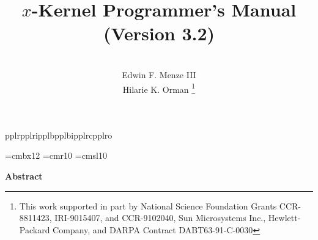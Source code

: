 
\setcounter{tocdepth}{5}




\makeatletter
{}%
{pplr}{pplri}{pplb}{pplbi}{pplrc}{pplro}
\makeatother
\def\caps{\family{palatino}\size{12}{12pt}\selectfont}

\makeatother
\def\nintt{\family{helvetica}\size{9}{11pt}\selectfont}
\makeatother
\def\sanss{\family{helvetica}\size{11}{11pt}\selectfont}
\makeatother
\def\smalltt{\family{courier}\size{9}{11pt}\selectfont}

\newcommand{\COURIERtt}{\fontfamily{courier}\size{9}{11pt}\selectfont}
\newcommand{\CMRtt}{\fontfamily{cmtt}\selectfont}

\font\bold=cmbx12
\font\smallfont=cmr10
\font\sem=cmsl10

\def\xk{$x$-kernel}

\title{$x$-Kernel Programmer's Manual \\ {\rm (Version 3.2)}}
\author{\\ Edwin F. Menze III\\ Hilarie K. Orman \thanks
{This work supported in part by 
National Science Foundation Grants CCR-8811423, IRI-9015407, and CCR-9102040, 
Sun Microsystems Inc., 
Hewlett-Packard Company, 
and DARPA Contract DABT63-91-C-0030}}
\maketitle{}

\begin{center}
{\bf\Large Abstract}
\end{center}
\begin{quote}

\end{quote}

%


\renewcommand\baselinestretch{1}
\small\normalsize

\newpage{}
\makeatletter
\def\@dottedtocline#1#2#3#4#5{\ifnum #1>\c@tocdepth \else
  \vskip \z@ plus.2\p@
  {\leftskip #2\relax \rightskip \@tocrmarg \parfillskip -\rightskip
    \parindent #2\relax\@afterindenttrue
   \interlinepenalty\@M
   \leavevmode
   \@tempdima #3\relax \advance\leftskip \@tempdima \hbox{}\hskip -\leftskip
    #4\nobreak\leaders\hbox{$\m@th \mkern \@dotsep mu\mathchar"012E\mkern \@dotsep
       mu$}\hfill \nobreak
           \hbox to\@pnumwidth{\hfil\reset@font\rm #5}\par}\fi}
\makeatother

